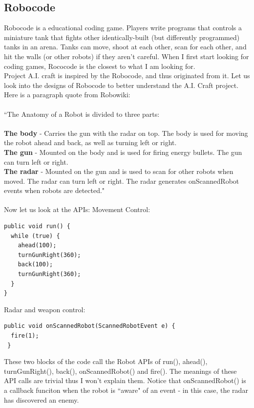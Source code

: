 \documentclass[12pt]{article}
\begin{document}
\subsection{Robocode}
Robocode is a educational coding game. Players write programs that controls a miniature tank that fights other identically-built (but differently programmed) tanks in an arena. Tanks can move, shoot at each other, scan for each other, and hit the walls (or other robots) if they aren't careful. When I first start looking for coding games, Rococode is the closest to what I am looking for.\\

Project A.I. craft is inspired by the Robocode, and thus originated from it. Let us look into the designs of Robocode to better understand the A.I. Craft project. Here is a paragraph quote from Robowiki:\cite{robowiki1} \\\\
``The Anatomy of a Robot is divided to three parts:\\\\
{\bf The body} - Carries the gun with the radar on top. The body is used for moving the robot ahead and back, as well as turning left or right.\\
{\bf The gun} - Mounted on the body and is used for firing energy bullets. The gun can turn left or right.\\
{\bf The radar} - Mounted on the gun and is used to scan for other robots when moved. The radar can turn left or right. The radar generates onScannedRobot events when robots are detected."\\\\
Now let us look at the APIs:\newline
Movement Control:
\begin{verbatim}
public void run() {
  while (true) {
    ahead(100);
    turnGunRight(360);
    back(100);
    turnGunRight(360);
  }
}
\end{verbatim}
\vspace{25pt}
Radar and weapon control:
\begin{verbatim}
public void onScannedRobot(ScannedRobotEvent e) {
  fire(1);
 }
\end{verbatim}

These two blocks of the code call the Robot APIs of run(), ahead(), turnGunRight(), back(), onScannedRobot() and fire(). The meanings of these API calls are trivial thus I won't explain them. Notice that onScannedRobot() is a callback funciton when the robot is ``aware" of an event - in this case, the radar has discovered an enemy.\\ 
\end{document}
